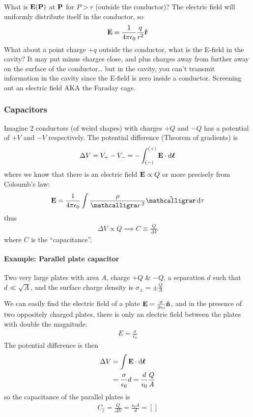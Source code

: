 \documentclass[../main.tex]{subfiles}
\begin{document}
What is $\vb E (\vb P)$ at $\vb P$ for $P > r$ (outside the conductor)? The electric field will uniformly distribute itself in the conductor, so
\begin{align*}
    \vb E = \frac{1}{4\pi\epsilon_0} \frac{q}{r^2} \vu r
\end{align*}
What about a point charge $+q$ outside the conductor, what is the E-field in the cavity? It may put minus charges close, and plus charges away from further away on the surface of the conductor\dots
but in the cavity, you can't transmit information in the cavity since the E-field is zero inside a conductor.
Screening out an electric field AKA the Faraday cage.

\subsubsection{Capacitors}

Imagine 2 conductors (of weird shapes) with charges $+Q$ and $-Q$ has a potential of $+V$ and $-V$ respectively.
The potential difference (Theorem of gradients) is
\begin{align*}
    \Delta V = V_+ - V_- = -\int_{(-)}^{(+)} \vb E \cdot \dd\vb*\ell
\end{align*}
where we know that there is an electric field $\vb E \propto Q$ or more precisely from Coloumb's law:
\begin{align*}
    \vb E = \ke \int \frac{\rho}{\scriptr^2} \vu\scriptr \dd \tau
\end{align*}
thus
\begin{align*}
    \Delta V \propto Q \implies C \equiv \frac{Q}{\Delta V}
\end{align*}
where $C$ is the ``capacitance''.

\paragraph*{Example: Parallel plate capacitor} Two very large plates with area $A$, charge $+Q$ \& $-Q$, a separation $d$ such that $d \ll \sqrt{A}$,
and the surface charge density is $\sigma_{\pm} = \pm \frac{Q}{A}$

We can easily find the electric field of a plate $\vb E = \frac{\sigma}{2\epsilon_0} \vu n$,
and in the presence of two oppositely charged plates, there is only an electric field between the plates with double the magnitude:
\begin{align*}
    E = \frac{\sigma}{\epsilon_0}
\end{align*}
The potential difference is then
\begin{align*}
    \Delta V &= \int \vb E \cdot \dd\vb*\ell \\
    &= \frac{\sigma}{\epsilon_0} d = \frac{d}{\epsilon_0} \frac{Q}{A}
\end{align*}
so the capacitance of the parallel plates is
\begin{align*}
    C_\parallel = \frac{Q}{\Delta V} = \frac{\epsilon_0 A}{d}=[]
\end{align*}
\end{document}
